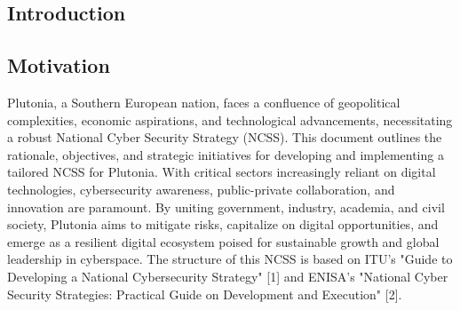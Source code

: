 \documentclass[
	a4paper, %
	10pt, %
]{CSSullivanBusinessReport}
\begin{document}
\begin{fullwidth}
\tableofcontents
\newpage

\begin{justify}

\section{Introduction}
\subsection{Motivation }
Plutonia, a Southern European nation, faces a confluence of geopolitical complexities, economic aspirations, and technological advancements, necessitating a robust National Cyber Security Strategy (NCSS). This document outlines the rationale, objectives, and strategic initiatives for developing and implementing a tailored NCSS for Plutonia. With critical sectors increasingly reliant on digital technologies, cybersecurity awareness, public-private collaboration, and innovation are paramount. By uniting government, industry, academia, and civil society, Plutonia aims to mitigate risks, capitalize on digital opportunities, and emerge as a resilient digital ecosystem poised for sustainable growth and global leadership in cyberspace. The structure of this NCSS is based on ITU's "Guide to Developing a National Cybersecurity Strategy" [1] and ENISA's "National Cyber Security Strategies: Practical Guide on Development and Execution" [2].


\end{justify}
\end{fullwidth}
\end{document}
